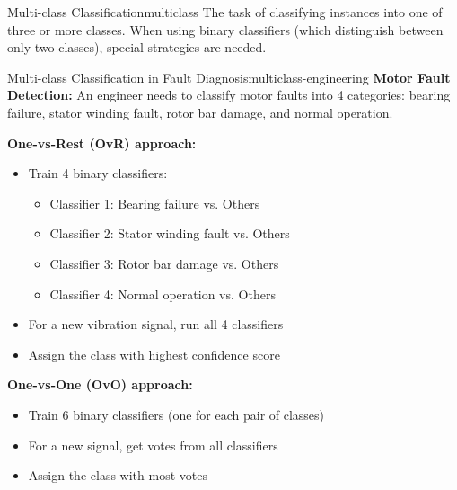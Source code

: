 \documentclass[12pt]{article}
\begin{document}
\begin{definition}{Multi-class Classification}{multiclass}
The task of classifying instances into one of three or more classes. When using binary classifiers (which distinguish between only two classes), special strategies are needed.
\end{definition}

\begin{example}{Multi-class Classification in Fault Diagnosis}{multiclass-engineering}
\textbf{Motor Fault Detection:} An engineer needs to classify motor faults into 4 categories: bearing failure, stator winding fault, rotor bar damage, and normal operation.

\textbf{One-vs-Rest (OvR) approach:}
\begin{itemize}
    \item Train 4 binary classifiers:
    \begin{itemize}
        \item Classifier 1: Bearing failure vs. Others
        \item Classifier 2: Stator winding fault vs. Others
        \item Classifier 3: Rotor bar damage vs. Others
        \item Classifier 4: Normal operation vs. Others
    \end{itemize}
    \item For a new vibration signal, run all 4 classifiers
    \item Assign the class with highest confidence score
\end{itemize}

\textbf{One-vs-One (OvO) approach:}
\begin{itemize}
    \item Train 6 binary classifiers (one for each pair of classes)
    \item For a new signal, get votes from all classifiers
    \item Assign the class with most votes
\end{itemize}

\begin{center}
\end{center}
\end{example}
\end{document}
